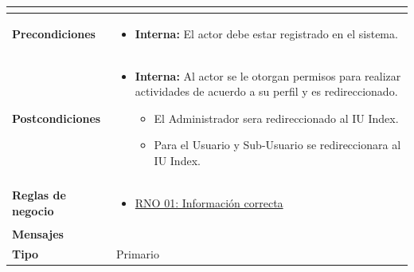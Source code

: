 \begin{center}
\begin{longtable}{| p{3.5cm} | p{11.5cm} |}
\begin{itemize}
            \end{itemize} \\
        \hline	
          \textbf{Precondiciones}& 
            \begin{itemize}
              \item \textbf{Interna:} El actor debe estar registrado en el sistema.
            \end{itemize} \\
        \hline	
          \textbf{Postcondiciones} & 
            \begin{itemize}
              \item \textbf{Interna:} Al actor se le otorgan permisos para realizar actividades de acuerdo a su perfil y es redireccionado. 
		\begin{itemize}
			\item El Administrador sera redireccionado al IU Index.
			\item Para el Usuario y Sub-Usuario se redireccionara al IU Index.
		\end{itemize}
            \end{itemize} \\
       \hline
         \textbf{Reglas de negocio} & 
         	\begin{itemize}
         	  \item {\hyperref[rnl_01]{RNO 01: Información correcta}}
	 \end{itemize} \\
       \hline
         \textbf{Mensajes} & \\
       \hline
         \textbf{Tipo} & Primario \\
    \hline	    
  \end{longtable}
\end{center}
\endgroup

